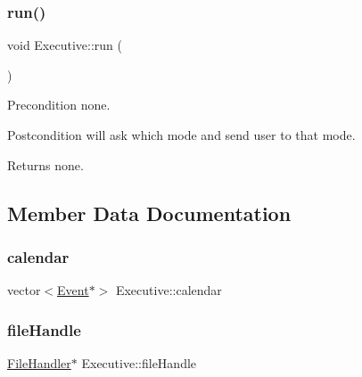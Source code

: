 \subsubsection{\texorpdfstring{run()}{run()}}
{\footnotesize\ttfamily void Executive\+::run (\begin{DoxyParamCaption}{ }\end{DoxyParamCaption})}

\begin{DoxyPrecond}{Precondition}
none. 
\end{DoxyPrecond}
\begin{DoxyPostcond}{Postcondition}
will ask which mode and send user to that mode. 
\end{DoxyPostcond}
\begin{DoxyReturn}{Returns}
none. 
\end{DoxyReturn}


\subsection{Member Data Documentation}
\mbox{\label{class_executive_a408db6c2dc536dc7f53688da5a19a649}} 
\subsubsection{\texorpdfstring{calendar}{calendar}}
{\footnotesize\ttfamily vector$<$\hyperlink{class_event}{Event}$\ast$$>$ Executive\+::calendar\hspace{0.3cm}{\ttfamily [private]}}

\mbox{\label{class_executive_afdbcae01934f40960cf4955756e33950}} 
\subsubsection{\texorpdfstring{file\+Handle}{fileHandle}}
{\footnotesize\ttfamily \hyperlink{class_file_handler}{File\+Handler}$\ast$ Executive\+::file\+Handle\hspace{0.3cm}{\ttfamily [private]}}

\mbox{\label{class_executive_a3c993d24ee13203a97736756e357f31d}} 
